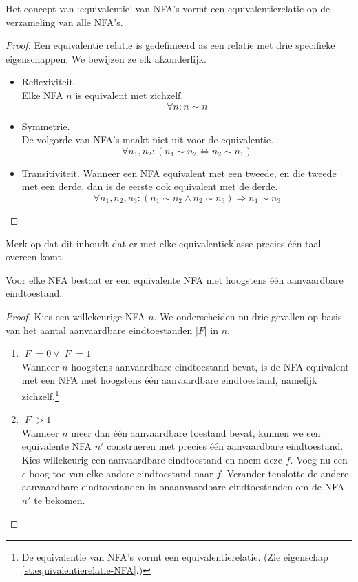 \documentclass[main.tex]{subfiles}
\begin{document}
\begin{st}
  \label{st:equivalentierelatie-NFA}
  Het concept van `equivalentie' van NFA's vormt een equivalentierelatie op de verzameling van alle NFA's.

  \begin{proof}
    Een equivalentie relatie is gedefinieerd as een relatie met drie specifieke eigenschappen.
    We bewijzen ze elk afzonderlijk.
    \begin{itemize}
    \item Reflexiviteit.\\
      Elke NFA $n$ is equivalent met zichzelf.
      \[ \forall n: n \sim n \]
    \item Symmetrie.\\
      De volgorde van NFA's maakt niet uit voor de equivalentie.
      \[ \forall n_{1},n_{2}: (n_{1} \sim n_{2} \Leftrightarrow n_{2} \sim n_{1}) \]
    \item Transitiviteit.
      Wanneer een NFA equivalent met een tweede, en die tweede met een derde, dan is de eerste ook equivalent met de derde.
      \[ \forall n_{1}, n_{2}, n_{3}: (n_{1} \sim n_{2} \wedge n_{2} \sim n_{3}) \Rightarrow n_{1} \sim n_{3} \]
    \end{itemize}
  \end{proof}
  Merk op dat dit inhoudt dat er met elke equivalentieklasse precies \'e\'en taal overeen komt.
\end{st}

\begin{st}
  \label{st:hoogstens-een-eindtoestand-NFA}
  Voor elke NFA bestaat er een equivalente NFA met hoogstens \'e\'en aanvaardbare eindtoestand.

  \begin{proof}
    Kies een willekeurige NFA $n$.
    We onderscheiden nu drie gevallen op basis van het aantal aanvaardbare eindtoestanden $|F|$ in $n$.
    \begin{enumerate}
    \item $|F| = 0 \vee |F| = 1$\\
      Wanneer $n$ hoogstens aanvaardbare eindtoestand bevat, is de NFA equivalent met een NFA met hoogstens \'e\'en aanvaardbare eindtoestand, namelijk zichzelf.\footnote{De equivalentie van NFA's vormt een equivalentierelatie. (Zie eigenschap \ref{st:equivalentierelatie-NFA}.)}
    \item $|F| > 1$\\
      Wanneer $n$ meer dan \'e\'en aanvaardbare toestand bevat, kunnen we een equivalente NFA $n'$ construeren met precies \'e\'en aanvaardbare eindtoestand.
      Kies willekeurig een aanvaardbare eindtoestand en noem deze $f$. 
      Voeg nu een $\epsilon$ boog toe van elke andere eindtoestand naar $f$.
      Verander tenslotte de andere aanvaardbare eindtoestanden in onaanvaardbare eindtoestanden om de NFA $n'$ te bekomen.
    \end{enumerate}
  \end{proof}
\end{st}
\end{document}
